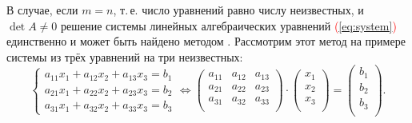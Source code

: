 \documentclass[10pt]{article}
\numberwithin{primer}{section}
\numberwithin{equation}{section}
\newcommand{\refform}[1]{\textcolor{red}{(\ref{#1})}}
\begin{document}
В случае, если $m=n$, т.\,е. число уравнений равно числу неизвестных, и $\det A \neq 0$
решение системы линейных алгебраических уравнений \refform{eq:system} единственно и может быть найдено методом .
Рассмотрим этот метод на примере системы из трёх уравнений на три неизвестных:
\begin{equation*}\label{eq:triuravn}
\begin{cases}
  a_{11}x_1 + a_{12}x_2 + a_{13}x_3 = b_1 \\
  a_{21}x_1 + a_{22}x_2 + a_{23}x_3 = b_2 \\
  a_{31}x_1 + a_{32}x_2 + a_{33}x_3 = b_3
\end{cases}
\Leftrightarrow
\begin{pmatrix}
  a_{11} & a_{12} & a_{13} \\
  a_{21} & a_{22} & a_{23} \\
  a_{31} & a_{32} & a_{33} \\
\end{pmatrix}\cdot
\begin{pmatrix}
  x_1 \\
  x_2 \\
  x_3 \\
\end{pmatrix}=
\begin{pmatrix}
  b_1 \\
  b_2 \\
  b_3 \\
\end{pmatrix}.
\end{equation*}
\end{document}
